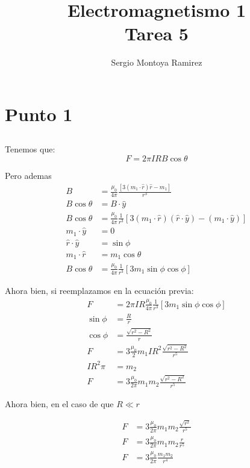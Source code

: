 \documentclass{report}
\title{\Huge{Electromagnetismo 1}\\Tarea 5}
\author{\huge{Sergio Montoya Ramirez}}
\date{}
\begin{document}
\maketitle
\newpage%
\tableofcontents
\pagebreak

\chapter{Punto 1}

\section{}

Tenemos que:
\[
  F = 2\pi I R B\cos\theta
\]

Pero ademas
\begin{align*}
  B &= \frac{\mu_0}{4\pi} \frac{\left[ 3 (m_1\cdot \hat{r})\hat{r} - m_1 \right]}{r^3}\\
  B \cos\theta &= B \cdot \hat{y}\\
  B\cos\theta &=\frac{\mu_0}{4\pi} \frac{1}{r^3} \left[ 3 (m_1\cdot \hat{r})(\hat{r} \cdot \hat{y}) - (m_1\cdot \hat{y}) \right]\\
  m_1 \cdot \hat{y} &= 0\\
  \hat{r}\cdot\hat{y} &= \sin\phi\\
  m_1 \cdot \hat{r} &= m_1 \cos\theta\\
  B\cos\theta &= \frac{\mu_0}{4\pi} \frac{1}{r^3} \left[ 3 m_1\sin\phi \cos\phi \right]
\end{align*}

Ahora bien, si reemplazamos en la ecuación previa:
\begin{align*}
  F &= 2 \pi I R \frac{\mu_0}{4\pi} \frac{1}{r^3} \left[ 3 m_1\sin\phi \cos\phi \right]\\
  \sin\phi &= \frac{R}{r}\\
  \cos\phi &= \frac{\sqrt{r^2 - R^2}}{r}\\
  F &= 3 \frac{\mu_0}{2} m_1 I R^2 \frac{\sqrt{r^2 - R^2}}{r^5}\\
  I R^2 \pi &= m_2\\
  F &= 3 \frac{\mu_0}{2\pi} m_1m_2\frac{\sqrt{r^2 - R^2}}{r^5}
\end{align*}

Ahora bien, en el caso de que $R \ll r$

\begin{align*}
  F &= 3 \frac{\mu_0}{2\pi} m_1m_2\frac{\sqrt{r^2}}{r^5}\\
  F &= 3 \frac{\mu_0}{2\pi} m_1m_2\frac{r}{r^5}\\
  F &= 3 \frac{\mu_0}{2\pi} \frac{m_1m_2}{r^4}
\end{align*}
\end{document}
